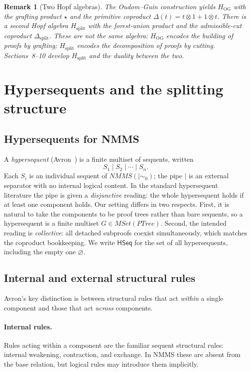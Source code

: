 \documentclass[11pt]{article}
\newtheorem{remark}[theorem]{Remark}
\newcommand{\mszero}{\mathrel{\mid\!\sim_{0}}}
\newcommand{\MSet}{\mathit{MSet}}
\newcommand{\NMMS}{\mathit{NMMS}}
\newcommand{\PTree}{\mathit{PTree}}
\begin{document}
\begin{remark}[Two Hopf algebras]
The Oudom--Guin construction yields $H_{\mathrm{OG}}$ with the grafting product $\star$ and the primitive coproduct $\Delta(t)=t\otimes 1+1\otimes t$.  There is a second Hopf algebra $H_{\mathrm{split}}$ with the forest-union product and the admissible-cut coproduct $\Delta_{\mathrm{split}}$.  These are \emph{not} the same algebra: $H_{\mathrm{OG}}$ encodes the \emph{building} of proofs by grafting; $H_{\mathrm{split}}$ encodes the \emph{decomposition} of proofs by cutting.  Sections~8--10 develop $H_{\mathrm{split}}$ and the duality between the two.
\end{remark}

\section{Hypersequents and the splitting structure}

\subsection{Hypersequents for NMMS}

A \emph{hypersequent} (Avron~\cite{avron1996hypersequents}) is a finite multiset of sequents, written
\[
S_1 \mid S_2 \mid \cdots \mid S_n.
\]
Each $S_i$ is an individual sequent of $\NMMS(\mszero)$; the pipe $\mid$ is an external separator with no internal logical content.  In the standard hypersequent literature the pipe is given a \emph{disjunctive} reading: the whole hypersequent holds if at least one component holds.  Our setting differs in two respects.  First, it is natural to take the components to be proof trees rather than bare sequents, so a hypersequent is a finite multiset $G\in\MSet(\PTree)$.  Second, the intended reading is \emph{collective}: all detached subproofs coexist simultaneously, which matches the coproduct bookkeeping.  We write $\mathsf{HSeq}$ for the set of all hypersequents, including the empty one $\varnothing$.

\subsection{Internal and external structural rules}

Avron's key distinction is between structural rules that act \emph{within} a single component and those that act \emph{across} components.

\paragraph{Internal rules.}  Rules acting within a component are the familiar sequent structural rules: internal weakening, contraction, and exchange.  In NMMS these are absent from the base relation, but logical rules may introduce them implicitly.
\end{document}
